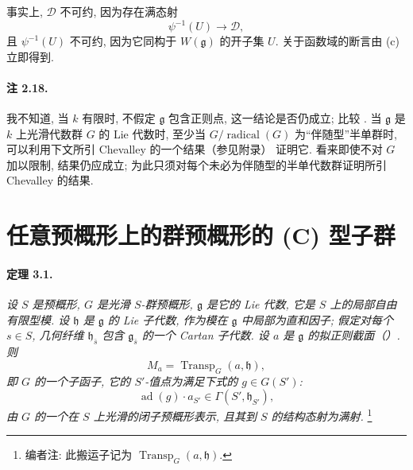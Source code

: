 事实上, \(\mathcal D\) 不可约, 因为存在满态射
\[
  \psi^{-1}(U)\longrightarrow\mathcal D,
\]
且 \(\psi^{-1}(U)\) 不可约, 因为它同构于 \(W(\mathfrak g)\) 的开子集 \(U\). 关于函数域的断言由 \textup{(c)} 立即得到.

\paragraph{\textbf{注 2.18.}}
我不知道, 当 \(k\) 有限时, 不假定 \(\mathfrak g\) 包含正则点, 这一结论是否仍成立; 比较 . 当 \(\mathfrak g\) 是 \(k\) 上光滑代数群 \(G\) 的 Lie 代数时, 至少当 \(G/\operatorname{radical}(G)\) 为“伴随型”半单群时, 可以利用下文所引 Chevalley 的一个结果\textup{（参见附录）} 证明它. 看来即使不对 \(G\) 加以限制, 结果仍应成立; 为此只须对每个未必为伴随型的半单代数群证明所引 Chevalley 的结果.



\section{任意预概形上的群预概形的 \textup{(C)} 型子群}

\paragraph{\textbf{定理 3.1.}}
{\itshape 设 \(S\) 是预概形, \(G\) 是光滑 \(S\)-群预概形, \(\mathfrak g\) 是它的 Lie 代数, 它是 \(S\) 上的局部自由有限型模. 设 \(\mathfrak h\) 是 \(\mathfrak g\) 的 Lie 子代数, 作为模在 \(\mathfrak g\) 中局部为直和因子; 假定对每个 \(s\in S\), 几何纤维 \(\mathfrak h_{\bar s}\) 包含 \(\mathfrak g_{\bar s}\) 的一个 Cartan 子代数. 设 \(a\) 是 \(\mathfrak g\) 的拟正则截面\textup{（）}. 则
\[
  M_a=\operatorname{Transp}_G(a,\mathfrak h),
\]
即 \(G\) 的一个子函子, 它的 \(S'\)-值点为满足下式的 \(g\in G(S')\):
\[
  \operatorname{ad}(g)\cdot a_{S'}
    \in\Gamma(S',\mathfrak h_{S'}),
\]
由 \(G\) 的一个在 \(S\) 上光滑的闭子预概形表示, 且其到 \(S\) 的结构态射为满射.}
\footnote{编者注: 此搬运子记为 \(\operatorname{Transp}_G(a,\mathfrak h)\).}

